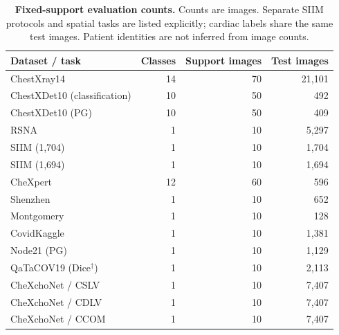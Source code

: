 \begin{table}[tp]
\centering
\caption{\textbf{Fixed-support evaluation counts.} Counts are images. Separate SIIM protocols and spatial tasks are listed explicitly; cardiac labels share the same test images. Patient identities are not inferred from image counts.}
\label{tab:supp-counts}
\small
\setlength{\tabcolsep}{4pt}
\begin{tabular*}{\textwidth}{@{\extracolsep{\fill}}lrrr@{}}
\toprule
Dataset / task & Classes & Support images & Test images \\
\midrule
ChestXray14 & 14 & 70 & 21,101 \\
ChestXDet10 (classification) & 10 & 50 & 492 \\
ChestXDet10 (PG) & 10 & 50 & 409 \\
RSNA & 1 & 10 & 5,297 \\
SIIM (1,704) & 1 & 10 & 1,704 \\
SIIM (1,694) & 1 & 10 & 1,694 \\
CheXpert & 12 & 60 & 596 \\
Shenzhen & 1 & 10 & 652 \\
Montgomery & 1 & 10 & 128 \\
CovidKaggle & 1 & 10 & 1,381 \\
Node21 (PG) & 1 & 10 & 1,129 \\
QaTaCOV19 (Dice$^\dagger$) & 1 & 10 & 2,113 \\
CheXchoNet / CSLV & 1 & 10 & 7,407 \\
CheXchoNet / CDLV & 1 & 10 & 7,407 \\
CheXchoNet / CCOM & 1 & 10 & 7,407 \\
\bottomrule
\end{tabular*}
\end{table}

